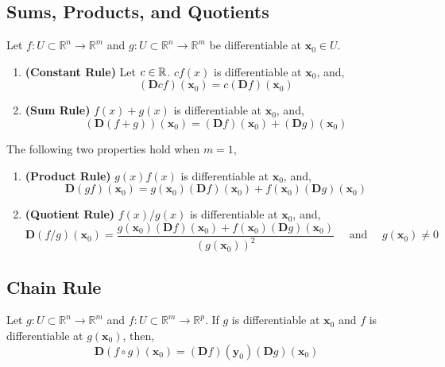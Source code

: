 \subsection{Sums, Products, and Quotients}
\begin{thm}
    Let $f: U \subset \mathbb{R}^n \rightarrow \mathbb{R}^m$ and $g: U \subset \mathbb{R}^n \rightarrow \mathbb{R}^m$ be differentiable at $\mathbf{x}_0 \in U$.
    \begin{enumerate}
        \item \textbf{(Constant Rule)} Let $c \in \mathbb{R}$. $c f(x)$ is differentiable at $\mathbf{x}_0$, and,
        \[(\mathbf{D} c f)\left(\mathbf{x}_0\right)=c (\mathbf{D} f)\left(\mathbf{x}_0\right)\]
        \item \textbf{(Sum Rule)} $f(x) + g(x)$ is differentiable at $\mathbf{x}_0$, and,
        \[(\mathbf{D} (f + g))\left(\mathbf{x}_0\right)=(\mathbf{D} f)\left(\mathbf{x}_0\right)+(\mathbf{D} g)\left(\mathbf{x}_0\right)\]
    \end{enumerate}
    The following two properties hold when $m = 1$,
    \begin{enumerate}
        \item \textbf{(Product Rule)} $g(x) f(x)$ is differentiable at $\mathbf{x}_0$, and,
        \[\mathbf{D}(g f)(\mathbf{x}_0) = g(\mathbf{x}_0)(\mathbf{D}f)(\mathbf{x}_0) + f(\mathbf{x}_0)(\mathbf{D} g)(\mathbf{x}_0)\]
        \item \textbf{(Quotient Rule)} $f(x)/g(x)$ is differentiable at $\mathbf{x}_0$, and,
        \[\mathbf{D}(f / g)(\mathbf{x}_0) = \frac{g(\mathbf{x}_0)(\mathbf{D}f)(\mathbf{x}_0) + f(\mathbf{x}_0)(\mathbf{D} g)(\mathbf{x}_0)}{(g(\mathbf{x}_0))^2} \quad \text{ and } \quad g(\mathbf{x}_0) \neq 0\]
    \end{enumerate}
\end{thm}

\subsection{Chain Rule}
\begin{thm}
    Let $g: U \subset \mathbb{R}^n \rightarrow \mathbb{R}^m$ and $f: U \subset \mathbb{R}^m \rightarrow \mathbb{R}^p$. If $g$ is differentiable at $\mathbf{x}_0$ and $f$ is differentiable at $g(\mathbf{x}_0)$, then,
    \[\mathbf{D}(f \circ g)\left(\mathbf{x}_0\right)=(\mathbf{D} f)\left(\mathbf{y}_0\right) (\mathbf{D} g) \left(\mathbf{x}_0\right)\]
\end{thm}

